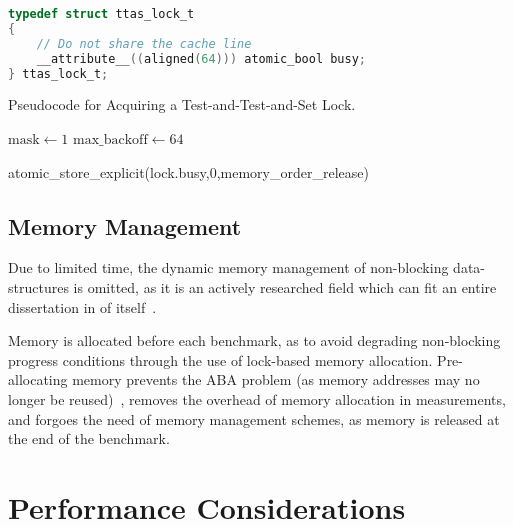 \begin{lstlisting}[language=C,caption={Test-and-Test-and-Set Lock Struct.}]
typedef struct ttas_lock_t
{
    // Do not share the cache line
    __attribute__((aligned(64))) atomic_bool busy;
} ttas_lock_t;

\end{lstlisting}

\begin{algorithm}
    \caption{Pseudocode for Acquiring a Test-and-Test-and-Set
    Lock.}\label{alg:ttas_acquire}
        $\text{mask} \gets 1$
        $\text{max\_backoff} \gets 64$
            {
            
        }
        atomic\_store\_explicit(lock.busy,0,memory\_order\_release)
\end{algorithm}

\subsection{Memory Management}
Due to limited time, the dynamic memory management of non-blocking
data-structures is omitted, as it is an actively researched field which can fit
an entire dissertation in of itself~\citep{valois1995datastructures,michael2004hazard}.

Memory is allocated before each benchmark, as to avoid degrading
non-blocking progress conditions through the use of lock-based memory
allocation. Pre-allocating memory prevents the ABA problem (as memory addresses
may no longer be reused)~\citep{dechev2010understanding}, removes the overhead
of memory allocation in measurements, and forgoes the need of memory management
schemes, as memory is released at the end of the benchmark.

\section{Performance Considerations}